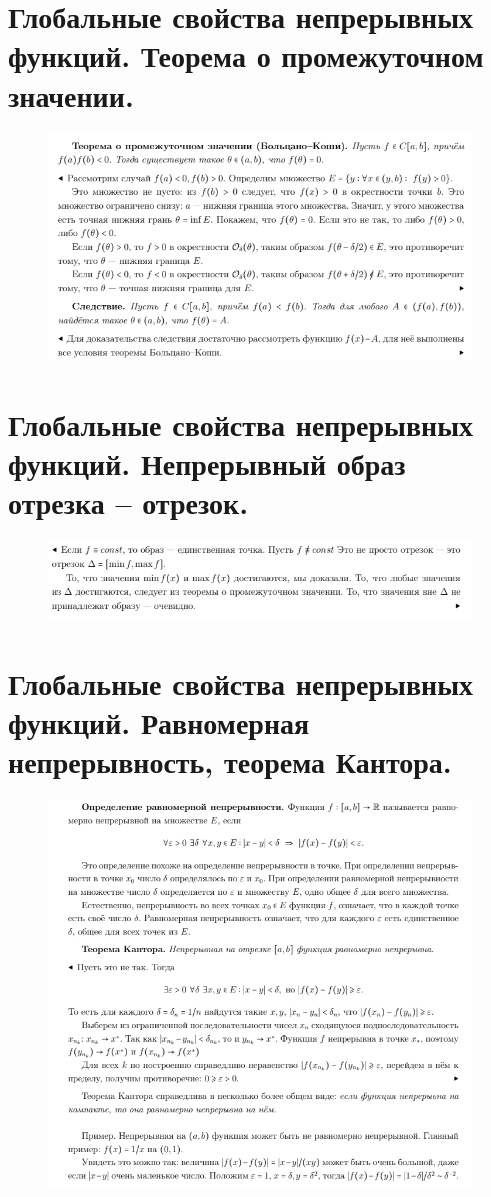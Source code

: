\section{Глобальные свойства непрерывных функций. Теорема о промежуточном значении.}

\begin{figure}[h!]
\centering
\includegraphics[scale=0.7]{Pictures/31.png}
\end{figure}
\newpage


\section{Глобальные свойства непрерывных функций. Непрерывный образ отрезка -- отрезок.}

 \begin{figure}[h!]
\centering
\includegraphics[scale=0.7]{Pictures/32.png}
\end{figure}


\section{Глобальные свойства непрерывных функций. Равномерная непрерывность, теорема Кантора.}
 
 \begin{figure}[h!]
\centering
\includegraphics[scale=0.6]{Pictures/33.png}
\end{figure}


